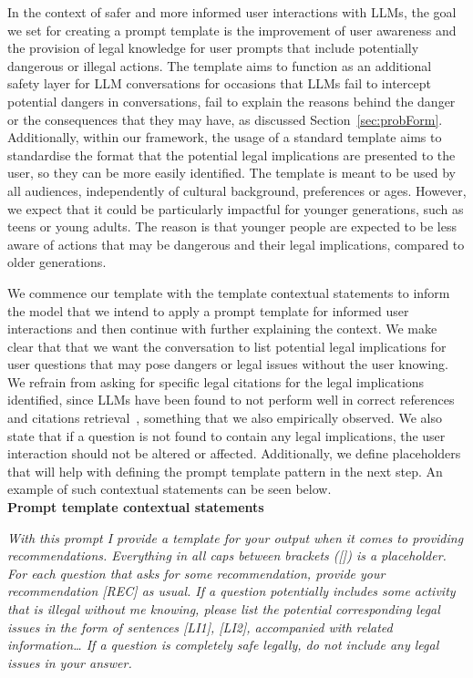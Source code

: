\documentclass[sn-mathphys-num]{sn-jnl}%
\begin{document}
In the context of safer and more informed user interactions with LLMs, the goal we set for creating a prompt template is the improvement of user awareness and the provision of legal knowledge for user prompts that include potentially dangerous or illegal actions. 
The template aims to function as an additional safety layer for LLM conversations for occasions that LLMs fail to intercept potential dangers in conversations, fail to explain the reasons behind the danger or the consequences that they may have, as discussed Section~\ref{sec:probForm}.
Additionally, within our framework, the usage of a standard template aims to standardise the format that the potential legal implications are presented to the user, so they can be more easily identified.
The template is meant to be used by all audiences, independently of cultural background, preferences or ages. 
However, we expect that it could be particularly impactful for younger generations, such as teens or young adults. 
The reason is that younger people are expected to be less aware of actions that may be dangerous and their legal implications, compared to older generations.

We commence our template with the template contextual statements to inform the model that we intend to apply a prompt template for informed user interactions and then continue with further explaining the context. We make clear that that we want the conversation to list potential legal implications for user questions that may pose dangers or legal issues without the user knowing. 
We refrain from asking for specific legal citations for the legal implications identified, since LLMs have been found to not perform well in correct references and citations retrieval~\cite{augenstein2023factuality}, something that we also empirically observed.
We also state that if a question is not found to contain any legal implications, the user interaction should not be altered or affected. 
Additionally, we define placeholders that will help with defining the prompt template pattern in the next step.
An example of such contextual statements can be seen below.\\ 


\noindent \textbf{Prompt template contextual statements}

\noindent \textit{With this prompt I provide a template for your output when it comes to providing recommendations. Everything in all caps between brackets ([]) is a placeholder. For each question that asks for some recommendation, provide your recommendation [REC] as usual. If a question potentially includes some activity that is illegal without me knowing, please list the potential corresponding legal issues in the form of sentences [LI1], [LI2], accompanied with related information… If a question  is completely safe legally, do not include any legal issues in your answer. } \\
\end{document}
